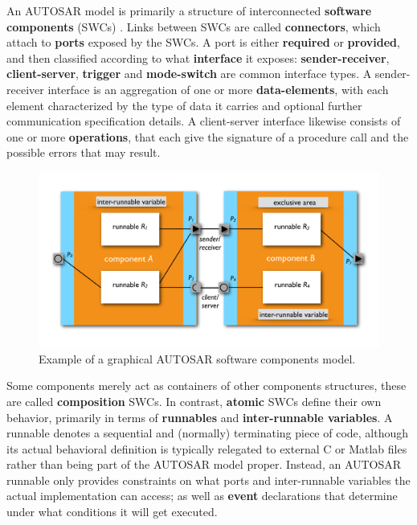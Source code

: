 \documentclass[10pt,conference]{IEEEtran}
\begin{document}
An AUTOSAR model is primarily a structure of interconnected \textbf{software components} (SWCs) \cite{AR:SWC}. Links between SWCs are called \textbf{connectors}, which attach to \textbf{ports} exposed by the SWCs. A port is either \textbf{required} or \textbf{provided}, and then classified according to what \textbf{interface} it exposes: \textbf{sender-receiver}, \textbf{client-server}, \textbf{trigger} and \textbf{mode-switch} are common interface types. A sender-receiver interface is an aggregation of one or more \textbf{data-elements}, with each element characterized by the type of data it carries and optional further communication specification details. A client-server interface likewise consists of one or more \textbf{operations}, that each give the signature of a procedure call and the possible errors that may result.

\begin{figure}
\includegraphics[page=1,width=\textwidth]{Fig}
\caption{\label{fig:model}{Example of a graphical AUTOSAR software components model.}}
\end{figure}


Some components merely act as containers of other components structures, these are called \textbf{composition} SWCs. In contrast, \textbf{atomic} SWCs define their own behavior, primarily in terms of \textbf{runnables} and \textbf{inter-runnable variables}. A runnable denotes a sequential and (normally) terminating piece of code, although its actual behavioral definition is typically relegated to external C or Matlab files rather than being part of the AUTOSAR model proper. Instead, an AUTOSAR runnable only provides constraints on what ports and inter-runnable variables the actual implementation can access; as well as \textbf{event} declarations that determine under what conditions it will get executed.
\end{document}
